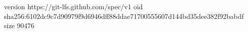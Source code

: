 version https://git-lfs.github.com/spec/v1
oid sha256:6102dc9c7d90979f9d6946dff88ddae71700555607d144bd35dee382f92babdf
size 90476
